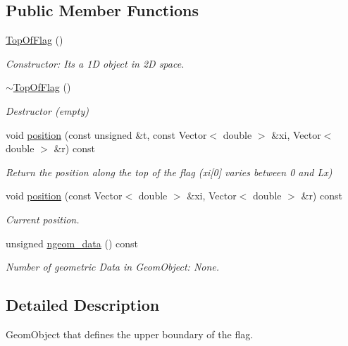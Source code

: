 \subsection*{Public Member Functions}
\begin{DoxyCompactItemize}
\item 
\hyperlink{classFlag__definition_1_1TopOfFlag_a187ed8b664190ab0feb971198d74ff2b}{Top\+Of\+Flag} ()
\begin{DoxyCompactList}\small\item\em Constructor\+: It\textquotesingle{}s a 1D object in 2D space. \end{DoxyCompactList}\item 
\hyperlink{classFlag__definition_1_1TopOfFlag_ab2f5971dfc14401c536ede9006da7c8a}{$\sim$\+Top\+Of\+Flag} ()
\begin{DoxyCompactList}\small\item\em Destructor (empty) \end{DoxyCompactList}\item 
void \hyperlink{classFlag__definition_1_1TopOfFlag_a99adccd501bc69e0af51918d77e0f1b7}{position} (const unsigned \&t, const Vector$<$ double $>$ \&xi, Vector$<$ double $>$ \&r) const
\begin{DoxyCompactList}\small\item\em Return the position along the top of the flag (xi\mbox{[}0\mbox{]} varies between 0 and Lx) \end{DoxyCompactList}\item 
void \hyperlink{classFlag__definition_1_1TopOfFlag_a0a902ee453f96231b41aa66e3c3b8bf0}{position} (const Vector$<$ double $>$ \&xi, Vector$<$ double $>$ \&r) const
\begin{DoxyCompactList}\small\item\em Current position. \end{DoxyCompactList}\item 
unsigned \hyperlink{classFlag__definition_1_1TopOfFlag_a1ca5543c07da97885e955acd241616ec}{ngeom\+\_\+data} () const
\begin{DoxyCompactList}\small\item\em Number of geometric Data in Geom\+Object\+: None. \end{DoxyCompactList}\end{DoxyCompactItemize}


\subsection{Detailed Description}
Geom\+Object that defines the upper boundary of the flag. 

